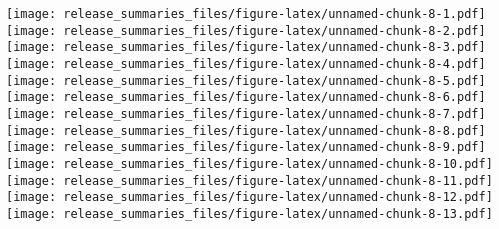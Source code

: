 \documentclass[]{article}
\begin{document}
\texttt{[image: release\_summaries\_files/figure-latex/unnamed-chunk-8-1.pdf]}
\texttt{[image: release\_summaries\_files/figure-latex/unnamed-chunk-8-2.pdf]}
\texttt{[image: release\_summaries\_files/figure-latex/unnamed-chunk-8-3.pdf]}
\texttt{[image: release\_summaries\_files/figure-latex/unnamed-chunk-8-4.pdf]}
\texttt{[image: release\_summaries\_files/figure-latex/unnamed-chunk-8-5.pdf]}
\texttt{[image: release\_summaries\_files/figure-latex/unnamed-chunk-8-6.pdf]}
\texttt{[image: release\_summaries\_files/figure-latex/unnamed-chunk-8-7.pdf]}
\texttt{[image: release\_summaries\_files/figure-latex/unnamed-chunk-8-8.pdf]}
\texttt{[image: release\_summaries\_files/figure-latex/unnamed-chunk-8-9.pdf]}
\texttt{[image: release\_summaries\_files/figure-latex/unnamed-chunk-8-10.pdf]}
\texttt{[image: release\_summaries\_files/figure-latex/unnamed-chunk-8-11.pdf]}
\texttt{[image: release\_summaries\_files/figure-latex/unnamed-chunk-8-12.pdf]}
\texttt{[image: release\_summaries\_files/figure-latex/unnamed-chunk-8-13.pdf]}
\end{document}
